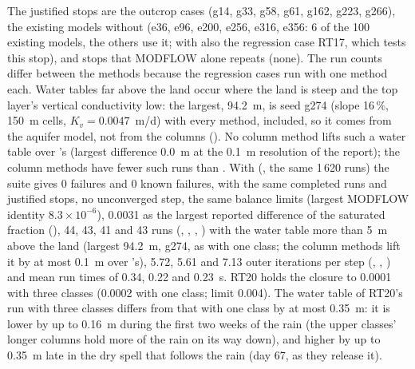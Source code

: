 The justified stops are the outcrop cases (g14, g33, g58, g61, g162, g223, g266), the existing models without
 (e36, e96, e200, e256, e316, e356: 6 of the 100 existing models, the others use it; with  also
the regression case RT17, which tests this stop), and stops that MODFLOW alone repeats (none). The run counts differ
between the methods because the regression cases run with one method each. Water tables far above the land occur where
the land is steep and the top layer's vertical conductivity low: the largest, 94.2~m, is seed g274 (slope 16\,\%,
150~m cells, $K_v=0.0047$~m/d) with every method,  included, so it comes from the aquifer model, not from the
columns (). No column method lifts such a water table over 's (largest difference 0.0~m at
the 0.1~m resolution of the report); the column methods have fewer such runs than . With
 (, the same 1\,620 runs) the suite gives 0 failures and 0 known
failures, with the same completed runs and justified stops, no unconverged step, the same balance limits (largest
MODFLOW identity $8.3\times10^{-6}$), 0.0031 as the largest reported difference of the saturated fraction (),
44, 43, 41 and 43 runs (, , , ) with the water table more than 5~m above the land (largest 94.2~m, g274, as
with one class; the column methods lift it by at most 0.1~m over 's), 5.72, 5.61 and 7.13 outer iterations per
step (, , ) and mean run times of 0.34, 0.22 and 0.23~s. RT20 holds the closure to
0.0001 with three classes (0.0002 with one class; limit 0.004). The water table of RT20's  run with three
classes differs from that with one class by at most 0.35~m: it is lower by up to 0.16~m during the first two weeks of the
rain (the upper classes' longer columns hold more of the rain on its way down), and higher by up to 0.35~m late in the
dry spell that follows the rain (day 67, as they release it).


